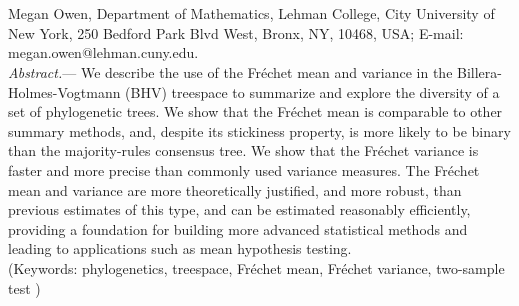 \documentclass[12pt,letterpaper]{article}
\theoremstyle{plain}
\theoremstyle{definition}
\renewcommand{\subsubsection}[1]{%
\vspace{2ex}
\noindent
\textit{#1.}---}
\begin{document}

\bigskip
\medskip
\begin{center}

\bigskip




\\
\\
\end{center}
\medskip
{} Megan Owen, Department of Mathematics, Lehman College, City University of New York, 250 Bedford Park Blvd West,
Bronx, NY, 10468, USA; E-mail: megan.owen@lehman.cuny.edu.\\



\subsubsection{Abstract} 
We describe the use of the Fr\'echet mean and variance in the Billera-Holmes-Vogtmann (BHV) treespace to summarize and explore the diversity of a set of phylogenetic trees.  We show that the Fr\'echet mean is comparable to other summary methods, and, despite its stickiness property, is more likely to be binary than the majority-rules consensus tree. We show that the Fr\'echet variance is faster and more precise than commonly used variance measures.  The Fr\'echet mean and variance are more theoretically justified, and more robust, than previous estimates of this type, and can be estimated reasonably efficiently, providing a foundation for building more advanced statistical methods and leading to applications such as mean hypothesis testing. \\
\noindent (Keywords: phylogenetics, treespace, Fr\'echet mean, Fr\'echet variance, two-sample test )\\
\end{document}
